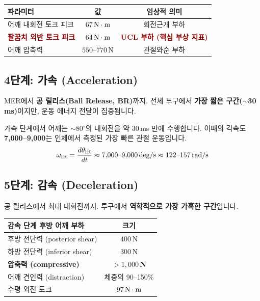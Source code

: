 \documentclass[11pt, a4paper]{report}
\begin{document}
\begin{center}
\renewcommand{\arraystretch}{1.3}
\begin{tabular}{lcc}
\toprule
\textbf{파라미터} & \textbf{값} & \textbf{임상적 의미} \\
\midrule
어깨 내회전 토크 피크 & $67\,\text{N}\cdot\text{m}$ & 회전근개 부하 \\
\textcolor{darkred}{\textbf{팔꿈치 외반 토크 피크}} & \textcolor{darkred}{\textbf{$64\,\text{N}\cdot\text{m}$}} & \textcolor{darkred}{\textbf{UCL 부하 (핵심 부상 지표)}} \\
어깨 압축력 & $550$--$770$\,N & 관절와순 부하 \\
\bottomrule
\end{tabular}
\end{center}

\subsection{4단계: 가속 (Acceleration)}

MER에서 \textbf{공 릴리스(Ball Release, BR)}까지. 전체 투구에서 \textbf{가장 짧은 구간($\sim$30\,ms)}이지만, 운동 에너지 전달이 집중됩니다.

\begin{keyidea}
가속 단계에서 어깨는 $\sim$80$^\circ$의 내회전을 약 30\,ms 만에 수행합니다. 이때의 각속도 \textbf{7,000--9,000\degps}는 인체에서 측정된 가장 빠른 관절 운동입니다.
\begin{equation}
\omega_{\text{IR}} = \frac{d\theta_{\text{IR}}}{dt} \approx 7{,}000\text{--}9{,}000\,\text{deg/s} \approx 122\text{--}157\,\text{rad/s}
\end{equation}
\end{keyidea}

\subsection{5단계: 감속 (Deceleration)}

공 릴리스에서 최대 내회전까지. 투구에서 \textbf{역학적으로 가장 가혹한 구간}입니다.

\begin{center}
\renewcommand{\arraystretch}{1.3}
\begin{tabular}{lc}
\toprule
\textbf{감속 단계 후방 어깨 부하} & \textbf{크기} \\
\midrule
후방 전단력 (posterior shear) & $400$\,N \\
하방 전단력 (inferior shear) & $300$\,N \\
\textbf{압축력 (compressive)} & \textbf{$>1{,}000$\,N} \\
어깨 견인력 (distraction) & 체중의 90--150\% \\
수평 외전 토크 & $97\,\text{N}\cdot\text{m}$ \\
\bottomrule
\end{tabular}
\end{center}
\end{document}

